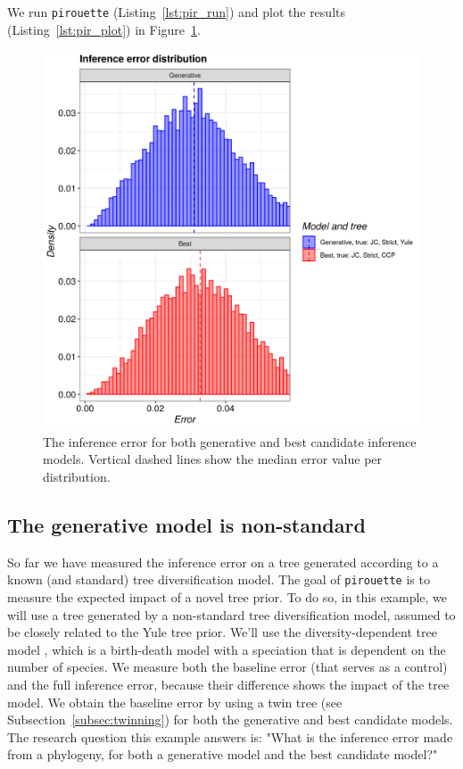 We run \verb;pirouette; (Listing~\ref{lst:pir_run}) 
and plot the results (Listing~\ref{lst:pir_plot}) in Figure~\ref{fig:example_2}.

\begin{figure}[H]
  \includegraphics[width=\textwidth]{pirouette_example_2/example_2_314/errors.png}
  \caption{
    The inference error for both generative and best candidate inference models.
    Vertical dashed lines show the median error value per distribution.
  }
  \label{fig:example_2}
\end{figure}

\subsection{The generative model is non-standard}\label{Comparing to background noise}

So far we have measured the inference error on a tree
generated according to a known (and standard) tree diversification model. 
The goal of \verb;pirouette; is to measure the expected impact of a novel tree prior.
To do so, in this example, we will use a tree generated by a non-standard 
tree diversification model, assumed to be closely related to the Yule tree prior.
We'll use the diversity-dependent tree model \cite{etienne2011diversity},
which is a birth-death model with a speciation that is dependent on the
number of species.
We measure both the baseline 
error (that serves as a control) and the full inference error, because their 
difference shows the impact of the tree model.
We obtain the baseline error by using a twin tree (see Subsection~\ref{subsec:twinning}) for 
both the generative and best candidate models.
The research question this example answers is:
"What is the inference error made from a phylogeny, 
for both a generative model and the best candidate model?"

